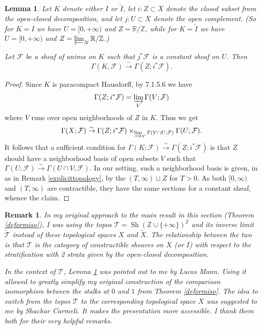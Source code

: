 \documentclass[12pt]{article}
\newtheorem{lemma}[theorem]{Lemma}
\newtheorem{remark}[theorem]{Remark}
\newcommand{\on}{\operatorname}
\begin{document}
\begin{lemma}\label{reducetosolenoid}
Let $K$ denote either $I$ or $\widetilde{I}$, let $i:Z\subset X$ denote the closed subset from the open-closed decomposition, and let $j:U\subset X$ denote the open complement.  (So for $K=I$ we have $U= [0,+\infty)$ and $Z=\mathbb{R}/\mathbb{Z}$, while for $K=\widetilde{I}$ we have $U=[0,+\infty)$ and $Z=\varprojlim_N \mathbb{R}/\mathbb{Z}$.)

Let $\mathcal{F}$ be a sheaf of anima on $K$ such that $j^\ast \mathcal{F}$ is a constant sheaf on $U$.  Then
$$\Gamma(K,\mathcal{F})\overset{\sim}{\rightarrow}\Gamma(Z;i^\ast\mathcal{F}).$$
\end{lemma}
\begin{proof}
Since $K$ is paracompact Hausdorff, by \cite{LurieHTT} 7.1.5.6 we have
$$\Gamma(Z;i^\ast\mathcal{F})=\varinjlim_V \Gamma(V;\mathcal{F})$$
where $V$ runs over open neighborhoods of $Z$ in $K$.  Thus we get
$$\Gamma(X;\mathcal{F})\overset{\sim}{\rightarrow}\Gamma(Z;i^\ast\mathcal{F})\times_{\varinjlim_V \Gamma(V\cap U;\mathcal{F})}\Gamma(U;\mathcal{F}).$$
It follows that a sufficient condition for $\Gamma(K;\mathcal{F})\overset{\sim}{\rightarrow}\Gamma(Z;i^\ast\mathcal{F})$ is that $Z$ should have a neighborhood basis of open subsets $V$ such that $\Gamma(U;\mathcal{F})\overset{\sim}{\rightarrow}\Gamma(U\cap V;\mathcal{F})$.  In our setting, such a neighborhood basis is given, in as in Remark \ref{explicittopology}, by the $(T,\infty)\sqcup Z$ for $T>0$.  As both $[0,\infty)$ and $(T,\infty)$ are contractible, they have the same sections for a constant sheaf, whence the claim.
\end{proof}


\begin{remark}
In my original approach to the main result in this section (Theorem \ref{deformiso}), I was using the topos $\mathcal{T}=\on{Sh}(\mathbb{Z}\cup\{+\infty\})^\mathbb{Z}$ and its inverse limit $\widetilde{\mathcal{T}}$ instead of these topological spaces $X$ and $\widetilde{X}$.  The relationship between the two is that $\mathcal{T}$ is the category of constructible sheaves on $X$ (or $I$) with respect to the stratification with 2 strata given by the open-closed decomposition.

In the context of $\mathcal{T}$, Lemma \ref{reducetosolenoid} was pointed out to me by Lucas Mann.  Using it allowed to greatly simplify my original construction of the comparison isomorphism between the stalks at $0$ and $1$ from Theorem \ref{deformiso}.  The idea to switch from the topos $\mathcal{T}$ to the corresponding topological space $X$ was suggested to me by Shachar Carmeli.  It makes the presentation more accessible.  I thank them both for their very helpful remarks.
\end{remark}
\end{document}
